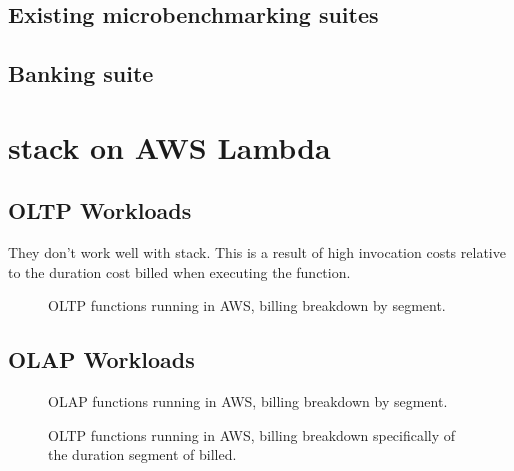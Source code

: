 \subsection{Existing microbenchmarking suites}

\subsection{Banking suite}

\section{\faaas{} stack on AWS Lambda}

\subsection{OLTP Workloads}
They don't work well with \faaas{} stack. This is a result of high invocation costs relative to the duration cost billed when executing the function.


\begin{figure}
    \begin{center}
        
    \end{center}
    \caption{OLTP \faaasc{} functions running in AWS, billing breakdown by segment.}
\end{figure}

\subsection{OLAP Workloads}

\begin{figure}
    \begin{center}
        
    \end{center}
    \caption{OLAP \faaasc{} functions running in AWS, billing breakdown by segment.}
\end{figure}

\begin{figure}
    \begin{center}
        
    \end{center}
    \caption{OLTP \faaasc{} functions running in AWS, billing breakdown specifically of the duration segment of billed.}
\end{figure}

